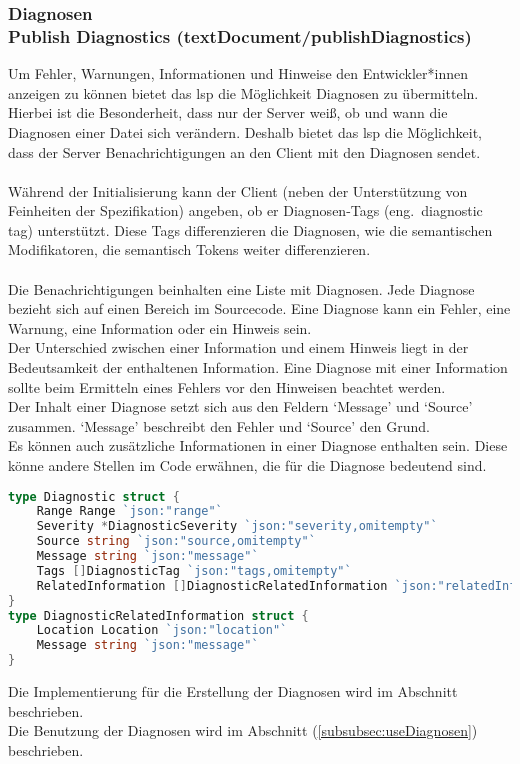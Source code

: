 \documentclass[./einleitung.tex]{subfiles}
\begin{document}
    \subsubsection[Diagnosen]{Diagnosen\\ {\textnormal{\footnotesize Publish Diagnostics (textDocument/publishDiagnostics) \cite{diagnostics}}}}\label{subsubsec:diagnostics}
    Um Fehler, Warnungen, Informationen und Hinweise den Entwickler*innen anzeigen zu können bietet das \acrshort{lsp} die Möglichkeit Diagnosen zu übermitteln.
    Hierbei ist die Besonderheit, dass nur der Server weiß, ob und wann die Diagnosen einer Datei sich verändern.
    Deshalb bietet das \acrshort{lsp} die Möglichkeit, dass der Server Benachrichtigungen an den Client mit den Diagnosen sendet.
    \\\\
    Während der Initialisierung kann der Client (neben der Unterstützung von Feinheiten der Spezifikation) angeben, ob er Diagnosen-Tags (eng.\ diagnostic tag) unterstützt.
    Diese Tags differenzieren die Diagnosen, wie die semantischen Modifikatoren, die semantisch Tokens weiter differenzieren.
    \\\\
    Die Benachrichtigungen beinhalten eine Liste mit Diagnosen.
    Jede Diagnose bezieht sich auf einen Bereich im Sourcecode.
    Eine Diagnose kann ein Fehler, eine Warnung, eine Information oder ein Hinweis sein.\\
    Der Unterschied zwischen einer Information und einem Hinweis liegt in der Bedeutsamkeit der enthaltenen Information.
    Eine Diagnose mit einer Information sollte beim Ermitteln eines Fehlers vor den Hinweisen beachtet werden.\\
    Der Inhalt einer Diagnose setzt sich aus den Feldern `Message' und `Source' zusammen.
    `Message' beschreibt den Fehler und `Source' den Grund.\\
    Es können auch zusätzliche Informationen in einer Diagnose enthalten sein.
    Diese könne andere Stellen im Code erwähnen, die für die Diagnose bedeutend sind.
    \begin{lstlisting}[language=Go, caption=Definition des Inhalts der Benachrichtigung, label=lst:diagnostics-result]
type Diagnostic struct {
	Range Range `json:"range"`
	Severity *DiagnosticSeverity `json:"severity,omitempty"`
  	Source string `json:"source,omitempty"`
	Message string `json:"message"`
	Tags []DiagnosticTag `json:"tags,omitempty"`
	RelatedInformation []DiagnosticRelatedInformation `json:"relatedInformation,omitempty"`
}
type DiagnosticRelatedInformation struct {
	Location Location `json:"location"`
	Message string `json:"message"`
}
    \end{lstlisting}
    Die Implementierung für die Erstellung der Diagnosen wird im Abschnitt  beschrieben.\\
    Die Benutzung der Diagnosen wird im Abschnitt  (\ref{subsubsec:useDiagnosen}) beschrieben.
\end{document}
